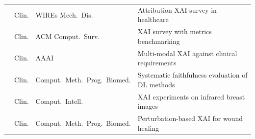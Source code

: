 \begin{table}[htbp]
\begin{tabularx}{\textwidth}{@{}p{1.6cm}p{1.2cm}p{2.8cm}X@{}}
\cite{jin2022explainable} & Clin. & WIREs Mech.\ Dis. & Attribution XAI survey in healthcare \\
\cite{Patricio2023} & Clin. & ACM Comput.\ Surv. & XAI survey with metrics benchmarking \\
\cite{jin2022evaluating} & Clin. & AAAI & Multi-modal XAI against clinical requirements \\
\cite{lamprou2024evaluation} & Clin. & Comput.\ Meth.\ Prog.\ Biomed. & Systematic faithfulness evaluation of DL methods \\
\cite{raghavan2024explainable} & Clin. & Comput.\ Intell. & XAI experiments on infrared breast images \\
\cite{jacob2025indian} & Clin. & Comput.\ Meth.\ Prog.\ Biomed. & Perturbation-based XAI for wound healing \\
\bottomrule
\end{tabularx}
\end{table}
